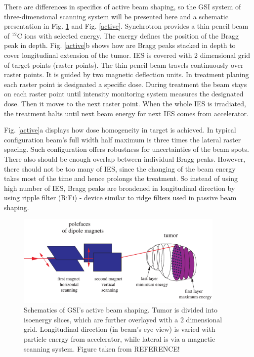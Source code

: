 \documentclass[type=dr, dr=rernat, accentcolor=tud7b,colorbacktitle, bigchapter, openright, twoside, 12pt ]{tudthesis}
\begin{document}
There are differences in specifics of active beam shaping, so the GSI system of three-dimensional scanning system will be presented here \cite{Haberer1993,Kraft2000,Schardt2010} and a schematic presentation in Fig. \ref{scanning} and Fig. \ref{active}.
Synchrotron provides a thin pencil beam of $^{12}$C ions with selected energy. The energy defines the position of the Bragg peak in depth. Fig. \ref{active}b shows how are Bragg peaks stacked in depth to cover longitudinal extension of the tumor.
IES is covered with 2 dimensional grid of target points (raster points). The thin pencil beam travels continuously over raster points. It is guided by two magnetic deflection units. In treatment planing each raster point is designated a specific dose. 
During treatment the beam stays on each raster point until intensity monitoring system measures the designated dose. Then it moves to the next raster point. When the whole IES is irradiated, the treatment halts until next beam energy for next IES comes
from accelerator.

Fig. \ref{active}a displays how dose homogeneity in target is achieved. In typical configuration beam's full width half maximum is three times the lateral raster spacing. Such configuration offers robustness for uncertainties of the beam spots.
There also should be enough overlap between individual Bragg peaks. However, there should not be too many of IES, since the changing of the beam energy takes most of the time and hence prolongs the treatment. So instead of using high number of
 IES, Bragg peaks are broadened in longitudinal direction by using ripple filter (RiFi) - device similar to ridge filters used in passive beam shaping. 



\newpage

\vspace*{0.6cm}

\begin{figure}[H]
\begin{center}
\includegraphics[width=0.9\textwidth]{./Images/therapy.png}
\caption{Schematics of GSI's active beam shaping. Tumor is divided into isoenergy slices, which are further overlayed with a 2 dimensional grid. 
Longitudinal direction (in beam's eye view) is varied with particle energy from accelerator, while lateral is via a magnetic scanning system. Figure taken from REFERENCE!}
\label{scanning}
\end{center}
\end{figure}
\end{document}
